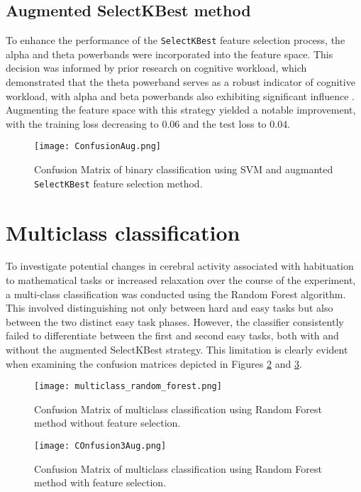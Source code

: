 \documentclass[conference]{IEEEtran}
\begin{document}
\subsection{Augmented SelectKBest method}

To enhance the performance of the \texttt{SelectKBest} feature selection process, the alpha and theta powerbands were incorporated into the feature space. This decision was informed by prior research on cognitive workload, which demonstrated that the theta powerband serves as a robust indicator of cognitive workload, with alpha and beta powerbands also exhibiting significant influence \cite{chikhi2022eeg}.  Augmenting the feature space with this strategy yielded a notable improvement, with the training loss decreasing to 0.06 and the test loss to 0.04.

\begin{figure}[htbp]
\centerline{\texttt{[image: ConfusionAug.png]}}
\caption{Confusion Matrix of binary classification using SVM and augmanted \texttt{SelectKBest} feature selection method.}
\label{figcmMRF}
\end{figure}

\section{Multiclass classification}

To investigate potential changes in cerebral activity associated with habituation to mathematical tasks or increased relaxation over the course of the experiment, a multi-class classification was conducted using the Random Forest algorithm. This involved distinguishing not only between hard and easy tasks but also between the two distinct easy task phases. However, the classifier consistently failed to differentiate between the first and second easy tasks, both with and without the augmented SelectKBest strategy. This limitation is clearly evident when examining the confusion matrices depicted in Figures \ref{CnfMulti1} and \ref{CnfMulti2}.

\begin{figure}[htbp]
\centerline{\texttt{[image: multiclass\_random\_forest.png]}}
\caption{Confusion Matrix of multiclass classification using Random Forest method without feature selection.}
\label{CnfMulti1}
\end{figure}

\begin{figure}[htbp]
\centerline{\texttt{[image: COnfusion3Aug.png]}}
\caption{Confusion Matrix of multiclass classification using Random Forest method with feature selection.}
\label{CnfMulti2}
\end{figure}
\end{document}
